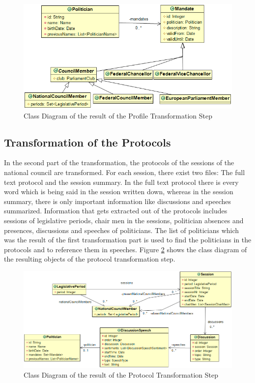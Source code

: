 
\begin{figure}
	\centering
	\includegraphics[width=\textwidth]{imgs/politicians_mandates_class_diagram}
	\caption{Class Diagram of the result of the Profile Transformation Step}
	\label{fig:politicians_mandates_class_diagram}
\end{figure}

\subsection{Transformation of the Protocols}
In the second part of the transformation, the protocols of the sessions of the national council are transformed. For each session, there exist two files: The full text protocol and the session summary. In the full text protocol there is every word which is being said in the session written down, whereas in the session summary, there is only important information like discussions and speeches summarized. Information that gets extracted out of the protocols includes sessions of legislative periods, chair men in the sessions, politician absences and presences, discussions and speeches of politicians. The list of politicians which was the result of the first transformation part is used to find the politicians in the protocols and to reference them in speeches. Figure \ref{fig:session_class_diagram} shows the class diagram of the resulting objects of the protocol transformation step.

\begin{figure}
	\centering
	\includegraphics[width=\textwidth]{imgs/session_class_diagram}
	\caption{Class Diagram of the result of the Protocol Transformation Step}
	\label{fig:session_class_diagram}
\end{figure}


